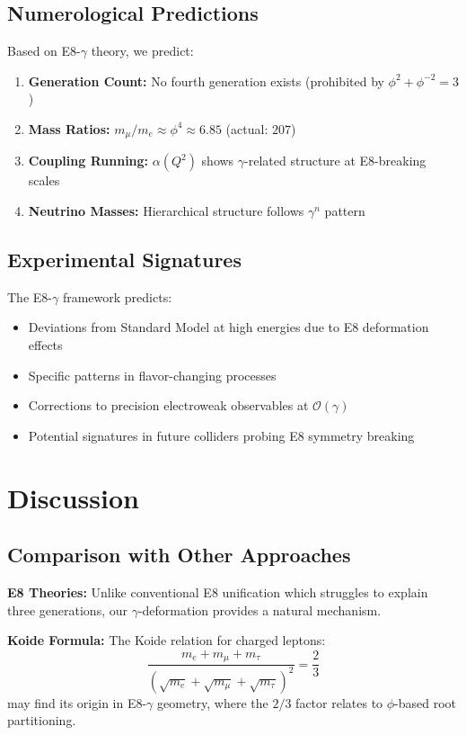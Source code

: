 \documentclass[12pt,a4paper]{article}
\begin{document}
\subsection{Numerological Predictions}

Based on E8-$\gamma$ theory, we predict:

\begin{enumerate}
\item \textbf{Generation Count:} No fourth generation exists (prohibited by $\phi^2 + \phi^{-2} = 3$)
\item \textbf{Mass Ratios:} $m_\mu/m_e \approx \phi^4 \approx 6.85$ (actual: $207$)
\item \textbf{Coupling Running:} $\alpha(Q^2)$ shows $\gamma$-related structure at E8-breaking scales
\item \textbf{Neutrino Masses:} Hierarchical structure follows $\gamma^n$ pattern
\end{enumerate}

\subsection{Experimental Signatures}

The E8-$\gamma$ framework predicts:

\begin{itemize}
\item Deviations from Standard Model at high energies due to E8 deformation effects
\item Specific patterns in flavor-changing processes
\item Corrections to precision electroweak observables at $\mathcal{O}(\gamma)$
\item Potential signatures in future colliders probing E8 symmetry breaking
\end{itemize}

\section{Discussion}

\subsection{Comparison with Other Approaches}

\textbf{E8 Theories:} Unlike conventional E8 unification which struggles to explain three generations, our $\gamma$-deformation provides a natural mechanism.

\textbf{Koide Formula:} The Koide relation for charged leptons:
\begin{equation}
\frac{m_e + m_\mu + m_\tau}{(\sqrt{m_e} + \sqrt{m_\mu} + \sqrt{m_\tau})^2} = \frac{2}{3}
\end{equation}
may find its origin in E8-$\gamma$ geometry, where the $2/3$ factor relates to $\phi$-based root partitioning.
\end{document}
